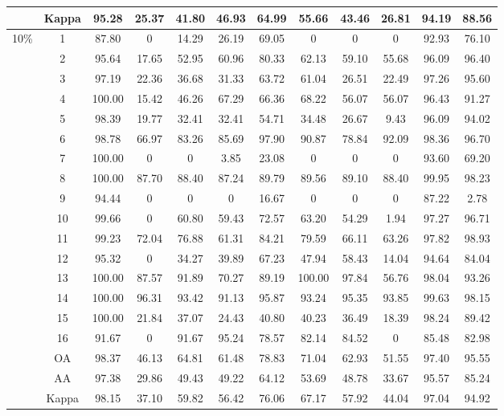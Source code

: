 \begin{table}[htbp]
{\begin{tabular}{c c c c c c c c c c c c}
& Kappa & 95.28 & 25.37 & 41.80 & 46.93 & 64.99 & 55.66 & 43.46 & 26.81 & 94.19 & 88.56 \\
\midrule
\multirow{19}{*}{10\%} 
& 1 & 87.80 & 0 & 14.29 & 26.19 & 69.05 & 0 & 0 & 0 & 92.93 & 76.10 \\
& 2 & 95.64 & 17.65 & 52.95 & 60.96 & 80.33 & 62.13 & 59.10 & 55.68 & 96.09 & 96.40 \\
& 3 & 97.19 & 22.36 & 36.68 & 31.33 & 63.72 & 61.04 & 26.51 & 22.49 & 97.26 & 95.60 \\
& 4 & 100.00 & 15.42 & 46.26 & 67.29 & 66.36 & 68.22 & 56.07 & 56.07 & 96.43 & 91.27 \\
& 5 & 98.39 & 19.77 & 32.41 & 32.41 & 54.71 & 34.48 & 26.67 & 9.43 & 96.09 & 94.02 \\
& 6 & 98.78 & 66.97 & 83.26 & 85.69 & 97.90 & 90.87 & 78.84 & 92.09 & 98.36 & 96.70 \\
& 7 & 100.00 & 0 & 0 & 3.85 & 23.08 & 0 & 0 & 0 & 93.60 & 69.20 \\
& 8 & 100.00 & 87.70 & 88.40 & 87.24 & 89.79 & 89.56 & 89.10 & 88.40 & 99.95 & 98.23 \\
& 9 & 94.44 & 0 & 0 & 0 & 16.67 & 0 & 0 & 0 & 87.22 & 2.78 \\
& 10 & 99.66 & 0 & 60.80 & 59.43 & 72.57 & 63.20 & 54.29 & 1.94 & 97.27 & 96.71 \\
& 11 & 99.23 & 72.04 & 76.88 & 61.31 & 84.21 & 79.59 & 66.11 & 63.26 & 97.82 & 98.93 \\
& 12 & 95.32 & 0 & 34.27 & 39.89 & 67.23 & 47.94 & 58.43 & 14.04 & 94.64 & 84.04 \\
& 13 & 100.00 & 87.57 & 91.89 & 70.27 & 89.19 & 100.00 & 97.84 & 56.76 & 98.04 & 93.26 \\
& 14 & 100.00 & 96.31 & 93.42 & 91.13 & 95.87 & 93.24 & 95.35 & 93.85 & 99.63 & 98.15 \\
& 15 & 100.00 & 21.84 & 37.07 & 24.43 & 40.80 & 40.23 & 36.49 & 18.39 & 98.24 & 89.42 \\
& 16 & 91.67 & 0 & 91.67 & 95.24 & 78.57 & 82.14 & 84.52 & 0 & 85.48 & 82.98 \\
& OA & 98.37 & 46.13 & 64.81 & 61.48 & 78.83 & 71.04 & 62.93 & 51.55 & 97.40 & 95.55 \\
& AA & 97.38 & 29.86 & 49.43 & 49.22 & 64.12 & 53.69 & 48.78 & 33.67 & 95.57 & 85.24 \\
& Kappa & 98.15 & 37.10 & 59.82 & 56.42 & 76.06 & 67.17 & 57.92 & 44.04 & 97.04 & 94.92 \\
\bottomrule
\end{tabular}
}
\end{table}

